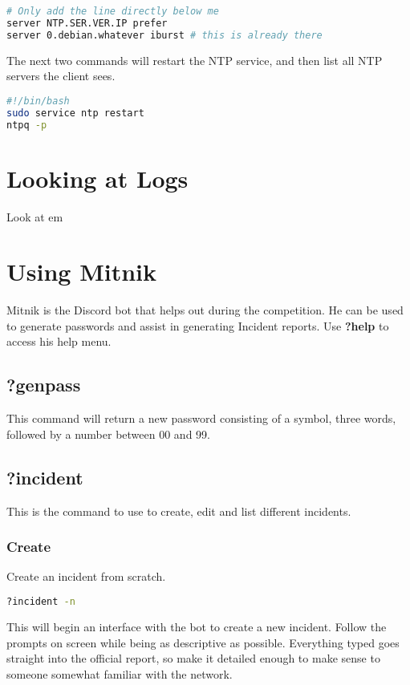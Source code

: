 \documentclass{article}
\begin{document}
\begin{lstlisting}[language=bash]
# Only add the line directly below me
server NTP.SER.VER.IP prefer
server 0.debian.whatever iburst # this is already there
\end{lstlisting}

The next two commands will restart the NTP service, and then list all NTP servers the client sees.

\begin{lstlisting}[language=bash]
#!/bin/bash
sudo service ntp restart
ntpq -p
\end{lstlisting}


\section{Looking at Logs}
Look at em

\section{Using Mitnik}
Mitnik is the Discord bot that helps out during the competition. He can be used to generate passwords and assist in generating Incident reports. Use \textbf{?help} to access his help menu.

\subsection{?genpass}
This command will return a new password consisting of a symbol, three words, followed by a number between 00 and 99. 

\subsection{?incident}
This is the command to use to create, edit and list different incidents.

\subsubsection{Create}
Create an incident from scratch.

\begin{lstlisting}[language=bash]
?incident -n
\end{lstlisting}

This will begin an interface with the bot to create a new incident. Follow the prompts on screen while being as descriptive as possible. Everything typed goes straight into the official report, so make it detailed enough to make sense to someone somewhat familiar with the network. 
\end{document}

